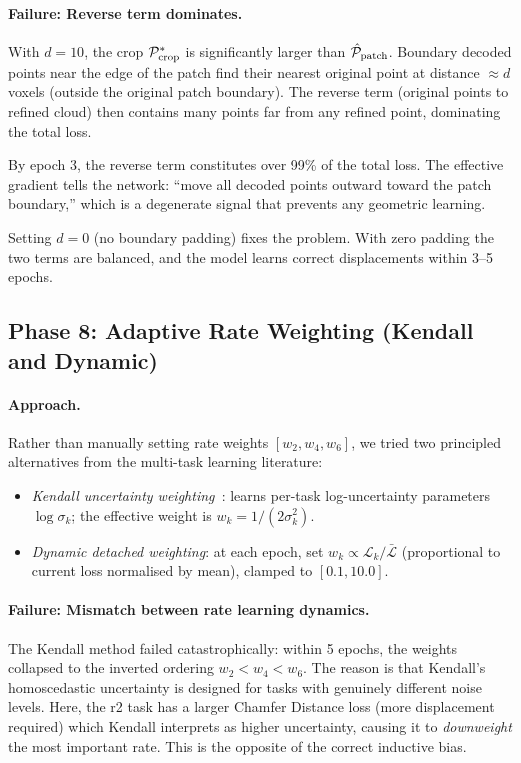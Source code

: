 \paragraph{Failure: Reverse term dominates.}
With $d = 10$, the crop $\mathcal{P}^*_{\text{crop}}$ is significantly larger than
$\hat{\mathcal{P}}_{\text{patch}}$.
Boundary decoded points near the edge of the patch find their nearest original
point at distance $\approx d$ voxels (outside the original patch boundary).
The reverse term (original points to refined cloud) then contains many points
far from any refined point, dominating the total loss.

By epoch 3, the reverse term constitutes over 99\% of the total loss.
The effective gradient tells the network: ``move all decoded points outward
toward the patch boundary,'' which is a degenerate signal that prevents any
geometric learning.

Setting $d = 0$ (no boundary padding) fixes the problem.
With zero padding the two terms are balanced, and the model learns correct
displacements within 3--5 epochs.

\subsection{Phase 8: Adaptive Rate Weighting (Kendall and Dynamic)}

\paragraph{Approach.}
Rather than manually setting rate weights $[w_2, w_4, w_6]$, we tried two
principled alternatives from the multi-task learning literature:

\begin{itemize}
  \item \textit{Kendall uncertainty weighting~\cite{kendall2018multi}}: learns
    per-task log-uncertainty parameters $\log\sigma_k$; the effective weight
    is $w_k = 1/(2\sigma_k^2)$.

  \item \textit{Dynamic detached weighting}: at each epoch, set
    $w_k \propto \mathcal{L}_k / \bar{\mathcal{L}}$ (proportional to current
    loss normalised by mean), clamped to $[0.1, 10.0]$.
\end{itemize}

\paragraph{Failure: Mismatch between rate learning dynamics.}
The Kendall method failed catastrophically: within 5 epochs, the weights
collapsed to the inverted ordering $w_2 < w_4 < w_6$.
The reason is that Kendall's homoscedastic uncertainty is designed for tasks
with genuinely different noise levels.
Here, the r2 task has a larger Chamfer Distance loss (more displacement required)
which Kendall interprets as higher uncertainty, causing it to \emph{downweight}
the most important rate.
This is the opposite of the correct inductive bias.

